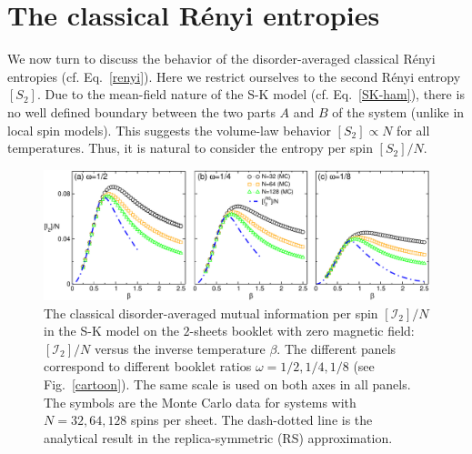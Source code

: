 \documentclass[twocolumn,superscriptaddress,prb,10pt]{revtex4-1}
\begin{document}
\section{The classical R\'enyi entropies}
\label{Renyi-section}

We now turn to discuss the behavior of the disorder-averaged classical R\'enyi entropies 
(cf. Eq.~\eqref{renyi}). Here we restrict ourselves to the second R\'enyi 
entropy $[S_2]$. Due to the mean-field nature of the S-K model (cf. Eq.~\eqref{SK-ham}), 
there is no well defined boundary between the two parts $A$ and $B$ of the system 
(unlike in local spin models). This suggests the volume-law behavior $[S_2]\propto N$ 
for all temperatures. Thus, it is natural to consider the entropy per spin 
$[S_2]/N$. 

\begin{figure}[t]
\includegraphics*[width=0.93\linewidth]{./draft_figs/I2_MC_v1}
\caption{The classical disorder-averaged mutual information per spin $[{\mathcal I}_2]/N$ 
 in the S-K model on the $2$-sheets booklet with zero magnetic field: 
 $[{\mathcal I}_2]/N$ versus the inverse temperature $\beta$. The 
 different panels correspond to different booklet ratios $\omega=1/2,1/4,1/8$ 
 (see Fig.~\ref{cartoon}). The same scale is used on both axes in all 
 panels. The symbols are the Monte Carlo data 
 for systems with $N=32,64,128$ spins per sheet. The dash-dotted line is 
 the analytical result in the replica-symmetric (RS) approximation.  
}
\label{I2-MC}
\end{figure}
\end{document}
